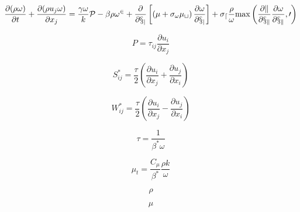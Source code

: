 {\newpage\clearpage
{}%
\begin{displaymath}
\frac{\partial (\rho \omega)}{\partial t} + \frac{\partial (\rho u_j \omega)}{\partial x_j}
  = \frac{\gamma \omega}{k} \cal P -
  \beta \rho \omega^2 + \frac{\partial}{\partial x_j}
  \left[ \left( \mu + \sigma_{\omega} \mu_t \right)
  \frac{\partial \omega}{\partial x_j} \right] +
  \sigma_d \frac{\rho}{\omega} {\rm max} \left( \frac{\partial k}{\partial x_k} \frac{\partial \omega}{\partial x_k}, 0 \right)
\end{displaymath}%
\lthtmldisplayZ
\lthtmlcheckvsize\clearpage}

{\newpage\clearpage
{}%
\begin{displaymath}
P = \tau_{ij} \frac{\partial u_i}{\partial x_j}
\end{displaymath}%
\lthtmldisplayZ
\lthtmlcheckvsize\clearpage}

{\newpage\clearpage
{}%
\begin{displaymath}
S_{ij}^* = \frac{\tau}{2} \left( \frac{\partial u_i}{\partial x_j} + \frac{\partial u_j}{\partial x_i} \right)
\end{displaymath}%
\lthtmldisplayZ
\lthtmlcheckvsize\clearpage}

{\newpage\clearpage
{}%
\begin{displaymath}
W_{ij}^* = \frac{\tau}{2} \left( \frac{\partial u_i}{\partial x_j} - \frac{\partial u_j}{\partial x_i} \right)
\end{displaymath}%
\lthtmldisplayZ
\lthtmlcheckvsize\clearpage}

{\newpage\clearpage
{}%
\begin{displaymath}
\tau = \frac{1}{\beta^* \omega}
\end{displaymath}%
\lthtmldisplayZ
\lthtmlcheckvsize\clearpage}

{\newpage\clearpage
{}%
\begin{displaymath}
\mu_t = \frac{C_{\mu}}{\beta^*} \frac{\rho k}{\omega}
\end{displaymath}%
\lthtmldisplayZ
\lthtmlcheckvsize\clearpage}

{\newpage\clearpage
{}%
\begin{displaymath}
\rho
\end{displaymath}%
\lthtmldisplayZ
\lthtmlcheckvsize\clearpage}

{\newpage\clearpage
{}%
\begin{displaymath}
\mu
\end{displaymath}%
\lthtmldisplayZ
\lthtmlcheckvsize\clearpage}


